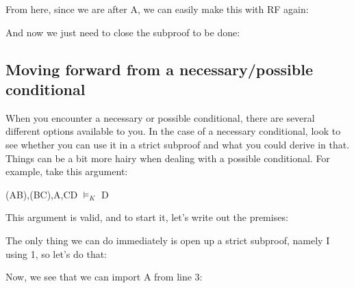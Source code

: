 From here, since we are after \ediamond A, we can easily make this with RF again:

\begin{fitchproof}
\open
{}
\end{fitchproof}

And now we just need to close the subproof to be done:

\begin{fitchproof}
\open
{}
\close
{}		
\end{fitchproof}

\subsection{Moving forward from a necessary/possible conditional}

When you encounter a necessary or possible conditional, there are several different options available to you. In the case of a necessary conditional, look to see whether you can use it in a strict subproof and what you could derive in that. Things can be a bit more hairy when dealing with a possible conditional. For example, take this argument: 
\begin{center}
\ediamond (A\eif B),\ebox (B\eif C),\ebox A,\ediamond C\eif D $\vDash_K$ D
\end{center}
This argument is valid, and to start it, let's write out the premises: 
\begin{fitchproof}
\end{fitchproof}
The only thing we can do immediately is open up a strict subproof, namely \ediamond I using 1, so let's do that:
\begin{fitchproof}
\open
{}
\end{fitchproof}

Now, we see that we can import A from line 3:

\begin{fitchproof}
\open
{}
\end{fitchproof}

